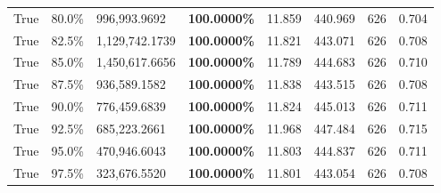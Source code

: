 \begin{table}[H]
\begin{tabular}{lllrllll}
\cline{1-8}
True & 80.0\% & 996,993.9692 & \bfseries \color{red} 100.0000\% & 11.859 & 440.969 & 626 & 0.704 \\
\cline{1-8}
True & 82.5\% & 1,129,742.1739 & \bfseries \color{red} 100.0000\% & 11.821 & 443.071 & 626 & 0.708 \\
\cline{1-8}
True & 85.0\% & 1,450,617.6656 & \bfseries \color{red} 100.0000\% & 11.789 & 444.683 & 626 & 0.710 \\
\cline{1-8}
True & 87.5\% & 936,589.1582 & \bfseries \color{red} 100.0000\% & 11.838 & 443.515 & 626 & 0.708 \\
\cline{1-8}
True & 90.0\% & 776,459.6839 & \bfseries \color{red} 100.0000\% & 11.824 & 445.013 & 626 & 0.711 \\
\cline{1-8}
True & 92.5\% & 685,223.2661 & \bfseries \color{red} 100.0000\% & 11.968 & 447.484 & 626 & 0.715 \\
\cline{1-8}
True & 95.0\% & 470,946.6043 & \bfseries \color{red} 100.0000\% & 11.803 & 444.837 & 626 & 0.711 \\
\cline{1-8}
True & 97.5\% & 323,676.5520 & \bfseries \color{red} 100.0000\% & 11.801 & 443.054 & 626 & 0.708 \\
\cline{1-8}
\bottomrule
\end{tabular}
\end{table}
